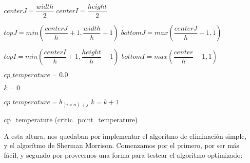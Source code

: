 \begin{algorithm}[H]
 \vspace{0.5cm}	
 
	$centerJ = \dfrac{width}{2}$\;
	$centerI = \dfrac{height}{2}$\;

	$topJ = min(\dfrac{centerJ}{h} +1, \dfrac{width}{h} -1)$\;	
	$bottomJ = max(\dfrac{centerJ}{h} - 1, 1)$\;			
	
	$topI = min(\dfrac{centerI}{h} +1, \dfrac{height}{h} -1)$\;	
	$bottomI = max(\dfrac{center}{h} - 1, 1)$\;	
	
	$cp\_temperature = 0.0$\;
	
	$k = 0$\;
	
	\vspace{0.5cm}
	 {
		\vspace{0.5cm}
		 {
		\vspace{0.5cm}
			$cp\_temperature = b_{(i \times n) + j}$\;
			$k = k+1$\;
			\vspace{0.5cm}
		}
	}
	
   	\vspace{0.5cm}
\caption{cp\_temperature (critic\_point\_temperature)\label{alg_critic_point_temperature}}  
\end{algorithm} 

A esta altura, nos quedaban por implementar el algorítmo de eliminación simple, y el algorítmo de Sherman Morrison. Comenzamos por el primero, por ser más fácil, y segundo por proveernos una forma para testear el algoritmo optimizado:

